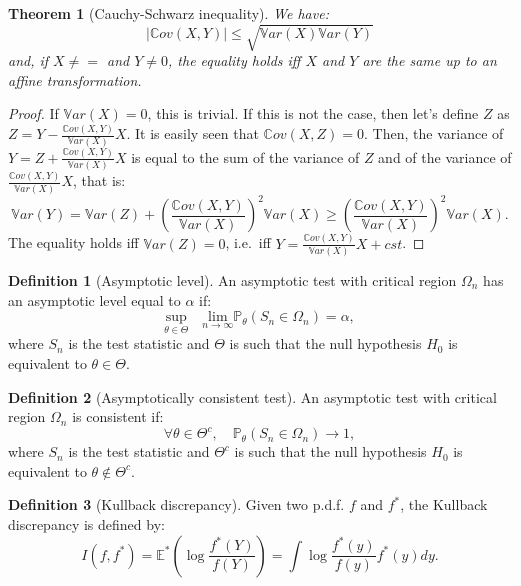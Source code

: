 \documentclass[
  12pt,
]{book}
\newtheorem{theorem}{Theorem}[chapter]
\theoremstyle{definition}
\newtheorem{definition}{Definition}[chapter]
\theoremstyle{definition}
\theoremstyle{definition}
\theoremstyle{definition}
\theoremstyle{remark}
\begin{document}
\begin{theorem}[Cauchy-Schwarz inequality]
\protect\hypertarget{thm:CauchySchwarz}{}\label{thm:CauchySchwarz}We have:
\[
|\mathbb{C}ov(X,Y)| \le \sqrt{\mathbb{V}ar(X)\mathbb{V}ar(Y)}
\]
and, if \(X \ne =\) and \(Y \ne 0\), the equality holds iff \(X\) and \(Y\) are the same up to an affine transformation.
\end{theorem}

\begin{proof}
If \(\mathbb{V}ar(X)=0\), this is trivial. If this is not the case, then let's define \(Z\) as \(Z = Y - \frac{\mathbb{C}ov(X,Y)}{\mathbb{V}ar(X)}X\). It is easily seen that \(\mathbb{C}ov(X,Z)=0\). Then, the variance of \(Y=Z+\frac{\mathbb{C}ov(X,Y)}{\mathbb{V}ar(X)}X\) is equal to the sum of the variance of \(Z\) and of the variance of \(\frac{\mathbb{C}ov(X,Y)}{\mathbb{V}ar(X)}X\), that is:
\[
\mathbb{V}ar(Y) = \mathbb{V}ar(Z) + \left(\frac{\mathbb{C}ov(X,Y)}{\mathbb{V}ar(X)}\right)^2\mathbb{V}ar(X) \ge \left(\frac{\mathbb{C}ov(X,Y)}{\mathbb{V}ar(X)}\right)^2\mathbb{V}ar(X).
\]
The equality holds iff \(\mathbb{V}ar(Z)=0\), i.e.~iff \(Y = \frac{\mathbb{C}ov(X,Y)}{\mathbb{V}ar(X)}X+cst\).
\end{proof}

\begin{definition}[Asymptotic level]
\protect\hypertarget{def:asmyptlevel}{}\label{def:asmyptlevel}An asymptotic test with critical region \(\Omega_n\) has an asymptotic level equal to \(\alpha\) if:
\[
\underset{\theta \in \Theta}{\mbox{sup}} \quad \underset{n \rightarrow \infty}{\mbox{lim}} \mathbb{P}_\theta (S_n \in \Omega_n) = \alpha,
\]
where \(S_n\) is the test statistic and \(\Theta\) is such that the null hypothesis \(H_0\) is equivalent to \(\theta \in \Theta\).
\end{definition}

\begin{definition}[Asymptotically consistent test]
\protect\hypertarget{def:asmyptconsisttest}{}\label{def:asmyptconsisttest}An asymptotic test with critical region \(\Omega_n\) is consistent if:
\[
\forall \theta \in \Theta^c, \quad \mathbb{P}_\theta (S_n \in \Omega_n) \rightarrow 1,
\]
where \(S_n\) is the test statistic and \(\Theta^c\) is such that the null hypothesis \(H_0\) is equivalent to \(\theta \notin \Theta^c\).
\end{definition}

\begin{definition}[Kullback discrepancy]
\protect\hypertarget{def:Kullback}{}\label{def:Kullback}Given two p.d.f. \(f\) and \(f^*\), the Kullback discrepancy is defined by:
\[
I(f,f^*) = \mathbb{E}^* \left( \log \frac{f^*(Y)}{f(Y)} \right) = \int \log \frac{f^*(y)}{f(y)} f^*(y) dy.
\]
\end{definition}
\end{document}
